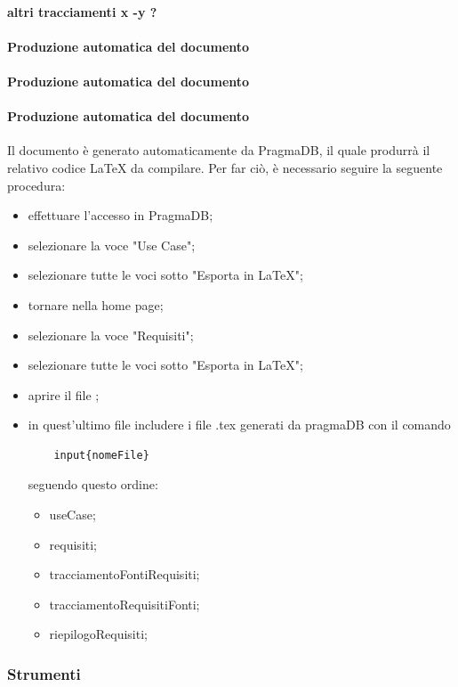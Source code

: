 \paragraph{altri tracciamenti x -y ?}
 \paragraph{Produzione automatica del documento \STdoc}
 \paragraph{Produzione automatica del documento \DPdoc}
\paragraph{Produzione automatica del documento \ARdoc}
Il documento \ARdoc{} è generato automaticamente da PragmaDB, il quale produrrà il relativo codice \LaTeX{} da compilare.
Per far ciò, è necessario seguire la seguente procedura:
\begin{itemize}
	\item effettuare l'accesso in PragmaDB;
	\item selezionare la voce "Use Case";
	\item selezionare tutte le voci sotto "Esporta in \LaTeX";
	\item tornare nella home page;
	\item selezionare la voce "Requisiti";
	\item selezionare tutte le voci sotto "Esporta in \LaTeX";
	\item aprire il file \ARfile;
	\item in quest'ultimo file includere i file .tex generati da pragmaDB con il comando \begin{verbatim}
	input{nomeFile}
	\end{verbatim}
	seguendo questo ordine: 
	\begin{itemize}
		\item useCase;
		\item requisiti;
		\item tracciamentoFontiRequisiti;
		\item tracciamentoRequisitiFonti;
		\item riepilogoRequisiti;
	\end{itemize}
\end{itemize}

\subsubsection{Strumenti}
